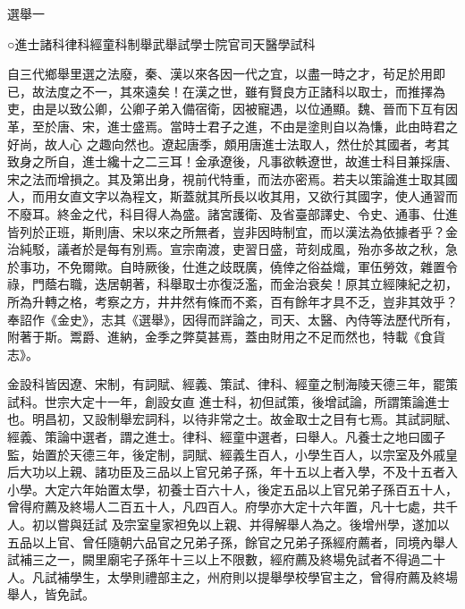 
\begin{pinyinscope}

 選舉一



 ○進士諸科律科經童科制舉武舉試學士院官司天醫學試科



 自三代鄉舉里選之法廢，秦、漢以來各因一代之宜，以盡一時之才，茍足於用即已，故法度之不一，其來遠矣！在漢之世，雖有賢良方正諸科以取士，而推擇為吏，由是以致公卿，公卿子弟入備宿衛，因被寵遇，以位通顯。魏、晉而下互有因革，至於唐、宋，進士盛焉。當時士君子之進，不由是塗則自以為慊，此由時君之好尚，故人心
 之趣向然也。遼起唐季，頗用唐進士法取人，然仕於其國者，考其致身之所自，進士纔十之二三耳！金承遼後，凡事欲軼遼世，故進士科目兼採唐、宋之法而增損之。其及第出身，視前代特重，而法亦密焉。若夫以策論進士取其國人，而用女直文字以為程文，斯蓋就其所長以收其用，又欲行其國字，使人通習而不廢耳。終金之代，科目得人為盛。諸宮護衛、及省臺部譯史、令史、通事、仕進皆列於正班，斯則唐、宋以來之所無者，豈非因時制宜，而以漢法為依據者乎？金治純駁，議者於是每有別焉。宣宗南渡，吏習日盛，苛刻成風，殆亦多故之秋，急
 於事功，不免爾歟。自時厥後，仕進之歧既廣，僥倖之俗益熾，軍伍勞效，雜置令祿，門蔭右職，迭居朝著，科舉取士亦復泛濫，而金治衰矣！原其立經陳紀之初，所為升轉之格，考察之方，井井然有條而不紊，百有餘年才具不乏，豈非其效乎？奉詔作《金史》，志其《選舉》，因得而詳論之，司天、太醫、內侍等法歷代所有，附著于斯。鬻爵、進納，金季之弊莫甚焉，蓋由財用之不足而然也，特載《食貨志》。



 金設科皆因遼、宋制，有詞賦、經義、策試、律科、經童之制海陵天德三年，罷策試科。世宗大定十一年，創設女直
 進士科，初但試策，後增試論，所謂策論進士也。明昌初，又設制舉宏詞科，以待非常之士。故金取士之目有七焉。其試詞賦、經義、策論中選者，謂之進士。律科、經童中選者，曰舉人。凡養士之地曰國子監，始置於天德三年，後定制，詞賦、經義生百人，小學生百人，以宗室及外戚皇后大功以上親、諸功臣及三品以上官兄弟子孫，年十五以上者入學，不及十五者入小學。大定六年始置太學，初養士百六十人，後定五品以上官兄弟子孫百五十人，曾得府薦及終場人二百五十人，凡四百人。府學亦大定十六年置，凡十七處，共千人。初以嘗與廷試
 及宗室皇家袒免以上親、并得解舉人為之。後增州學，遂加以五品以上官、曾任隨朝六品官之兄弟子孫，餘官之兄弟子孫經府薦者，同境內舉人試補三之一，闕里廟宅子孫年十三以上不限數，經府薦及終場免試者不得過二十人。凡試補學生，太學則禮部主之，州府則以提舉學校學官主之，曾得府薦及終場舉人，皆免試。




\end{pinyinscope}

